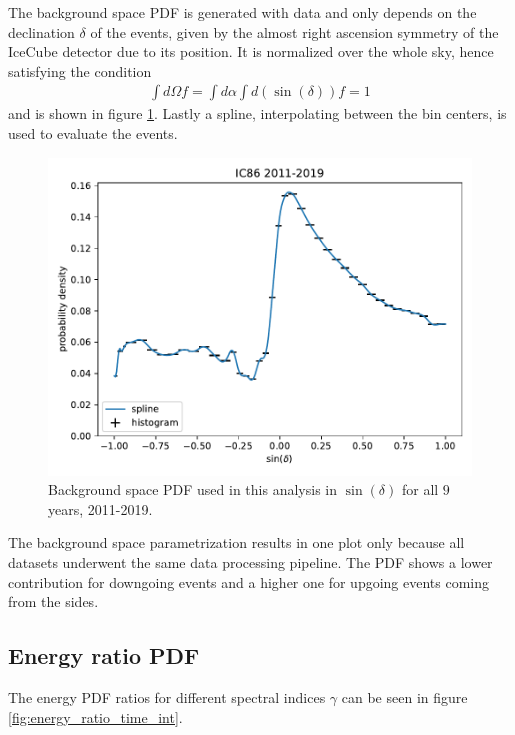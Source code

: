 The background space PDF is generated with data and only depends on the declination $\delta$ of the events, given by the almost right ascension symmetry of the IceCube detector due to its position.
It is normalized over the whole sky, hence satisfying the condition
\begin{align}
  \int d\Omega f = \int d\alpha \int d(\sin(\delta)) f = 1
\end{align}
and is shown in figure \ref{fig:bg_param_time_int}.
Lastly a spline, interpolating between the bin centers, is used to evaluate the events.
\begin{figure}
    \centering
    \includegraphics[width=\linewidth]{Plots/05_csky/bg_space_pdf.pdf}
    \caption{Background space PDF used in this analysis in $\sin{(\delta)}$ for all $\num{9}$ years, 2011-2019.}
    \label{fig:bg_param_time_int}
\end{figure}
The background space parametrization results in one plot only because all datasets underwent the same data processing pipeline.
The PDF shows a lower contribution for downgoing events and a higher one for upgoing events coming from the sides.

\subsection{Energy ratio PDF}

The energy PDF ratios for different spectral indices $\gamma$ can be seen in figure \ref{fig:energy_ratio_time_int}.

